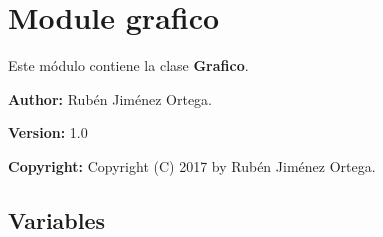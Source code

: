 %
%
%


\section{Module grafico}

    \label{grafico}
Este módulo contiene la clase \textbf{Grafico}.

\textbf{Author:} Rubén Jiménez Ortega.



\textbf{Version:} 1.0



\textbf{Copyright:} Copyright (C) 2017 by Rubén Jiménez Ortega.





  \subsection{Variables}

